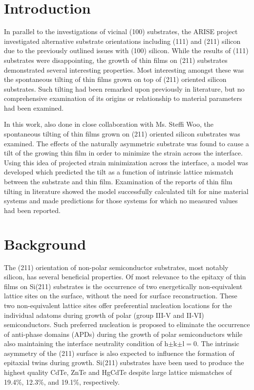 \section{Introduction}\label{sec:211}
In parallel to the investigations of vicinal (100) substrates, the ARISE project investigated alternative substrate orientations including (111) and (211) silicon due to the previously outlined issues with (100) silicon.
While the results of (111) substrates were disappointing, the growth of thin films on (211) substrates demonstrated several interesting properties.
Most interesting amongst these was the spontaneous tilting of thin films grown on top of (211) oriented silicon substrates.
Such tilting had been remarked upon previously in literature, but no comprehensive examination of its origins or relationship to material parameters had been examined.

In this work, also done in close collaboration with Ms.
Steffi Woo, the spontaneous tilting of thin films grown on (211) oriented silicon substrates was examined.
The effects of the naturally asymmetric substrate was found to cause a tilt of the growing thin film in order to minimize the strain across the interface.
Using this idea of projected strain minimization across the interface, a model was developed which predicted the tilt as a function of intrinsic lattice mismatch between the substrate and thin film.
Examination of the reports of thin film tilting in literature showed the model successfully calculated tilt for nine material systems and made predictions for those systems for which no measured values had been reported.
\section{Background}
The (211) orientation of non-polar semiconductor substrates, most notably silicon, has several beneficial properties.
Of most relevance to the epitaxy of thin films on Si(211) substrates is the occurrence of two energetically non-equivalent lattice sites on the surface, without the need for surface reconstruction\cite{Wright1982}.
These two non-equivalent lattice sites offer preferential nucleation locations for the individual adatoms during growth of polar (group III-V and II-VI) semiconductors.
Such preferred nucleation is proposed to eliminate the occurrence of anti-phase domains (APDs) during the growth of polar semiconductors\cite{Wright1982} while also maintaining the interface neutrality condition of h\(\pm\)k\(\pm\)l\(=\)0\cite{Wright1982}.
The intrinsic asymmetry of the (211) surface is also expected to influence the formation of epitaxial twins during growth\cite{Devenyi2011}.
Si(211) substrates have been used to produce the highest quality CdTe\cite{Zhao2011}, ZnTe\cite{Wang2011a} and HgCdTe\cite{Dhar1997a} despite large lattice mismatches of 19.4\%, 12.3\%, and 19.1\%, respectively.

